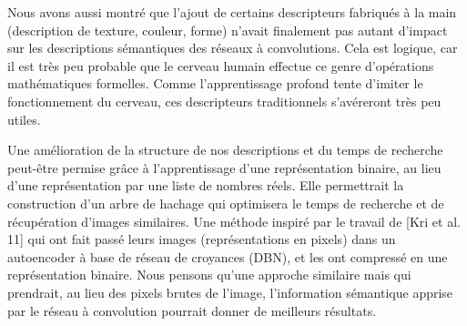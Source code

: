 Nous avons aussi montré que l'ajout de certains descripteurs fabriqués à la main (description de texture, couleur, forme) n'avait finalement pas autant d'impact sur les descriptions sémantiques des réseaux à convolutions. Cela est logique, car il est très peu probable que le cerveau humain effectue ce genre d’opérations mathématiques formelles. Comme l'apprentissage profond tente d'imiter le fonctionnement du cerveau, ces descripteurs traditionnels s’avéreront très peu utiles.

Une amélioration de la structure de nos descriptions et du temps de recherche peut-être permise grâce à l'apprentissage d'une représentation binaire, au lieu d'une représentation par une liste de nombres réels. Elle permettrait la construction d'un arbre de hachage qui optimisera le temps de recherche et de récupération d'images similaires. Une méthode inspiré par le travail de [Kri et al. 11] qui ont fait passé leurs images (représentations en pixels) dans un autoencoder à base de réseau de croyances (DBN), et les ont compressé en une représentation binaire. Nous pensons qu'une approche similaire mais qui prendrait, au lieu des pixels brutes de l'image, l'information sémantique apprise par le réseau à convolution pourrait donner de meilleurs résultats.

	

